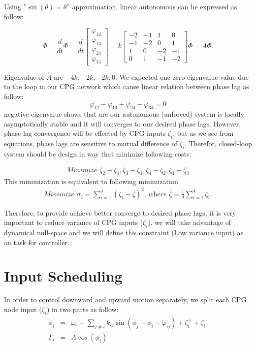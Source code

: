 \documentclass{article}
\begin{document}
Using ''\small{$\sin(\theta)=\theta$}'' approximation, linear autonomous can be expressed as follow:

  
  	\[ \dot{\Phi} = \frac{d}{dt} \Phi =\frac{d}{dt}
  	\left[\begin{array}{c}\varphi_{12} \\ \varphi_{13} \\ \varphi_{24} \\ \varphi_{34}\end{array}\right]
  	=k\left[ \begin{array}{rrrr}
	-2 & -1 &  1 &  0   \\
	-1 & -2 &  0 &  1  \\
	 1 &  0 & -2 & -1   \\
	 0 &  1 & -1 & -2 
	\end{array} \right] \Phi = \hat{A}\Phi.\] 
	
Eigenvalue of $\hat{A}$ are $-4k,-2k,-2k, 0$. We expected one zero eigenvalue-value due to the loop in our CPG network which cause linear relation between phase lag as follow: $$\varphi_{12} - \varphi_{13} + \varphi_{24} - \varphi_{34} = 0$$
negative eigenvalue shows that are our autonomous (unforced) system is locally asymptotically stable and it will converges to our desired phase lags. However, phase lag convergence will be effected by CPG inputs $\zeta_i$, but as we see from equations, phase lags are sensitive to mutual difference of $\zeta_i$. Therefor, closed-loop system should be design in way that minimize following costs:

\begin{eqnarray}\label{eq:one_node}
	\textit{Minimize    } \zeta_2-\zeta_1, \zeta_3-\zeta_1, \zeta_4-\zeta_2, \zeta_4-\zeta_3 
\end{eqnarray}
This minimization is equivalent to following minimization
\begin{eqnarray}\label{eq:one_node}
	\textit{Minimize    } \sigma_{\zeta} = \sum\limits_{i=1}^4 \left( \zeta_i - \bar{\zeta} \right)^2 \textit{, where } \bar{\zeta} = \frac{1}{4}\sum\limits_{i=1}^4\zeta_i.
\end{eqnarray}

Therefore, to provide achieve better converge to desired phase lags, it is very important to reduce variance of CPG inputs ($\zeta_i$). we will take advantage of dynamical null-space and we will define this constraint (Low variance input) as an task for controller.

\section*{Input Scheduling}
In order to control downward and upward motion separately, we split each CPG node input ($\zeta_i$) in two parts as follow:
\begin{eqnarray}\label{eq:one_node}
	\dot \phi_i &=& \omega_{b} + \sum_{j \neq i} k_{ij} \sin \left( \phi_j - \phi_i - \tilde{\varphi}_{ij} \right ) + \zeta_i^+ + \zeta_i^-\\
	\Gamma_i    &=& A \cos(\phi_i)
\end{eqnarray}
\end{document}
